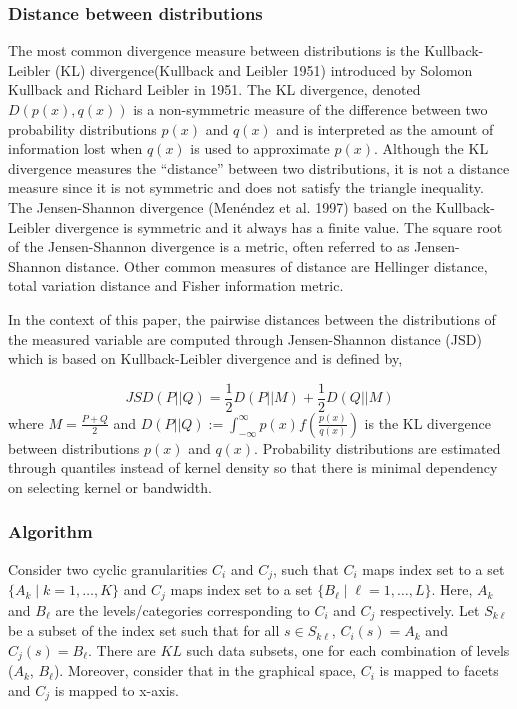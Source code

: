 \documentclass[
]{article}
\begin{document}
\hypertarget{distance-between-distributions}{%
\subsubsection{Distance between distributions}\label{distance-between-distributions}}

The most common divergence measure between distributions is the Kullback-Leibler (KL) divergence(Kullback and Leibler 1951) introduced by Solomon Kullback and Richard Leibler in 1951. The KL divergence, denoted \(D(p(x), q(x))\) is a non-symmetric measure of the difference between two probability distributions \(p(x)\) and \(q(x)\) and is interpreted as the amount of information lost when \(q(x)\) is used to approximate \(p(x)\). Although the KL divergence measures the ``distance'' between two distributions, it is not a distance measure since it is not symmetric and does not satisfy the triangle inequality. The Jensen-Shannon divergence (Menéndez et al. 1997) based on the Kullback-Leibler divergence is symmetric and it always has a finite value. The square root of the Jensen-Shannon divergence is a metric, often referred to as Jensen-Shannon distance. Other common measures of distance are Hellinger distance, total variation distance and Fisher information metric.

In the context of this paper, the pairwise distances between the distributions of the measured variable are computed through Jensen-Shannon distance (JSD) which is based on Kullback-Leibler divergence and is defined by,

\[JSD(P||Q) = \frac{1}{2}D(P||M) + \frac{1}{2}D(Q||M)\]
where \(M = \frac{P+Q}{2}\) and
\(D(P||Q) := \int^\infty_{-\infty} p(x)f(\frac{p(x)}{q(x)})\) is the KL divergence between distributions \(p(x)\) and \(q(x)\). Probability distributions are estimated through quantiles instead of kernel density so that there is minimal dependency on selecting kernel or bandwidth.

\hypertarget{algorithm}{%
\subsubsection{Algorithm}\label{algorithm}}

Consider two cyclic granularities \(C_i\) and \(C_j\), such that \(C_i\) maps index set to a set \(\{A_k \mid k=1,\dots,K\}\) and \(C_j\) maps index set to a set \(\{B_\ell \mid \ell =1,\dots,L\}\). Here, \(A_k\) and \(B_\ell\) are the levels/categories corresponding to \(C_i\) and \(C_j\) respectively. Let \(S_{k\ell}\) be a subset of the index set such that for all \(s \in S_{k\ell}\), \(C_i(s) = A_k\) and \(C_j(s) = B_\ell\). There are \(KL\) such data subsets, one for each combination of levels (\(A_k\), \(B_\ell\)). Moreover, consider that in the graphical space, \(C_i\) is mapped to facets and \(C_j\) is mapped to x-axis.
\end{document}
